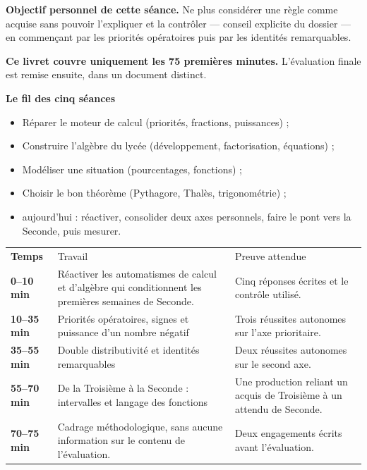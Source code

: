 \documentclass[10pt,a4paper]{article}
\begin{document}
\begin{goalbox}
\textbf{Objectif personnel de cette séance.} Ne plus considérer une règle comme acquise sans pouvoir l'expliquer et la contrôler — conseil explicite du dossier — en commençant par les priorités opératoires puis par les identités remarquables.
\par\medskip
\textbf{Ce livret couvre uniquement les 75 premières minutes.} L'évaluation finale est remise ensuite, dans un document distinct.
\end{goalbox}
\begin{methodbox}
\textbf{Le fil des cinq séances}
\begin{itemize}[leftmargin=13mm,labelsep=3mm,itemsep=1.5pt]
\item[\textbf{\color{Navy}S1}] Réparer le moteur de calcul (priorités, fractions, puissances) ;
\item[\textbf{\color{Navy}S2}] Construire l'algèbre du lycée (développement, factorisation, équations) ;
\item[\textbf{\color{Navy}S3}] Modéliser une situation (pourcentages, fonctions) ;
\item[\textbf{\color{Navy}S4}] Choisir le bon théorème (Pythagore, Thalès, trigonométrie) ;
\item[\textbf{\color{Navy}S5}] aujourd'hui : réactiver, consolider deux axes personnels, faire le pont vers la Seconde, puis mesurer.
\end{itemize}
\end{methodbox}
\par\noindent\begin{tabularx}{\linewidth}{>{\bfseries}p{20mm} X X}
\rowcolor{Navy}\color{white}Temps & \color{white}Travail & \color{white}Preuve attendue \\
0--10 min & Réactiver les automatismes de calcul et d'algèbre qui conditionnent les premières semaines de Seconde. & Cinq réponses écrites et le contrôle utilisé. \\
10--35 min & Priorités opératoires, signes et puissance d'un nombre négatif & Trois réussites autonomes sur l'axe prioritaire. \\
35--55 min & Double distributivité et identités remarquables & Deux réussites autonomes sur le second axe. \\
55--70 min & De la Troisième à la Seconde : intervalles et langage des fonctions & Une production reliant un acquis de Troisième à un attendu de Seconde. \\
70--75 min & Cadrage méthodologique, sans aucune information sur le contenu de l'évaluation. & Deux engagements écrits avant l'évaluation. \\
\end{tabularx}
\end{document}
